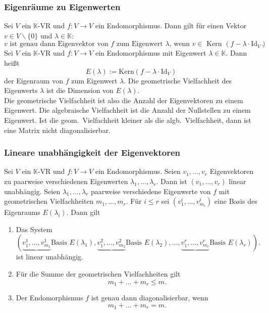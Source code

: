 \documentclass[a4paper,12pt]{article}
\numberwithin{equation}{section}
\begin{document}
\subsubsection{Eigenräume zu Eigenwerten}
Sei $V$ ein $\mathbb{K}$-VR und $f:V\rightarrow V$ ein Endomorphismus. Dann gilt für einen Vektor $v \in V\backslash\{0\}$ und $\lambda  \in \mathbb{K}$:
\[ 
        v\text{ ist genau dann Eigenvektor von $f$ zum Eigenwert $\lambda $, wenn $v \in $ Kern $\left(f-\lambda \cdot \text{Id}_V\right)$ }
.\] 
Sei $V$ ein $\mathbb{K}$-VR und $f:V\rightarrow V$ ein Endomorphismus mit Eigenwert $\lambda  \in \mathbb{K}$. Dann heißt
\[ 
        E\left(\lambda \right):=\text{Kern}\left(f-\lambda \cdot \text{Id}_V\right)
\] 
der Eigenraum von $f$ zum Eigenwert $\lambda $. Die geometrische Vielfachheit des Eigenwerts $\lambda $ ist die Dimension von $E\left(\lambda \right)$.\\\indent
Die geometrische Vielfachheit ist also die Anzahl der Eigenvektoren zu einem Eigenwert. Die algebraische Vielfachheit ist die Anzahl der Nullstellen zu einem Eigenwert. Ist die geom.\ Vielfachheit kleiner als die algb.\ Vielfachheit, dann ist eine Matrix nicht diagonalisierbar.

\subsubsection{Lineare unabhängigkeit der Eigenvektoren}
Sei $V$ ein $\mathbb{K}$-VR und $f:V\rightarrow V$ ein Endomorphismus. Seien $v_1,\hdots ,v_r$ Eigenvektoren zu paarweise verschiedenen Eigenwerten $\lambda _1,\hdots ,\lambda _r$. Dann ist $\left(v_1,\hdots ,v_r\right)$ linear unabhängig. Seien $\lambda _1,\hdots ,\lambda _r$ paarweise verschiedene Eigenwerte von $f$ mit geometrischen Vielfachheiten $m_1,\hdots ,m_r$. Für $i\leq r$ sei $\left(v_1^i,\hdots ,v_{m_i}^i\right)$ eine Basis des Eigenraums $E\left(\lambda _i\right)$. Dann gilt
\begin{enumerate}[label=(\alph*)]
        \item Das System 
                \[ 
                        \left(\underbrace{v_1^1,\hdots ,v_{m_1}^1}{\text{Basis }E\left(\lambda _1\right)},\underbrace{v_1^2,\hdots ,v_{m_2}^2}{\text{Basis }E\left(\lambda _2\right)},\hdots ,\underbrace{v_1^r,\hdots ,v_{m_r}^r}{\text{Basis }E\left(\lambda _r\right)}\right)
                .\] 
                ist linear unabhängig.
        \item Für die Summe der geometrischen Vielfachheiten gilt
                \[ 
                        m_1+\hdots +m_r\leq m
                .\] 
        \item Der Endomorphismus $f$ ist genau dann diagonalisierbar, wenn
                \[ 
                        m_1+\hdots +m_r=m
                .\] 
\end{enumerate}
\end{document}
